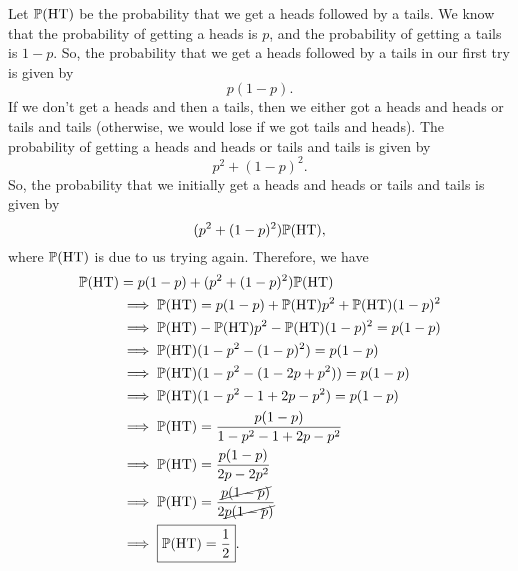\begin{mdframed}[]
    \begin{mdframed}[]
        Let $\mathbb{P}(\text{HT})$ be the probability that we get a heads followed by a tails. We know that the probability of getting a heads is $p$, and the probability of getting a tails is $1 - p$. So, the probability that we get a heads followed by a tails in our first try is given by
        \[p(1 - p).\]
        If we don't get a heads and then a tails, then we either got a heads and heads or tails and tails (otherwise, we would lose if we got tails and heads). The probability of getting a heads and heads or tails and tails is given by 
        \[p^2 + (1 - p)^2.\]
        So, the probability that we initially get a heads and heads or tails and tails is given by
        \[(p^2 + (1 - p)^2) \mathbb{P}(\text{HT}),\]
        where $\mathbb{P}(\text{HT})$ is due to us trying again. Therefore, we have 
        \begin{equation*}
            \begin{aligned}
                \mathbb{P}(\text{HT}) &= p(1 - p) + (p^2 + (1 - p)^2) \mathbb{P}(\text{HT}) \\ 
                    &\implies \mathbb{P}(\text{HT}) = p(1 - p) + \mathbb{P}(\text{HT}) p^2 + \mathbb{P}(\text{HT}) (1 - p)^2 \\ 
                    &\implies \mathbb{P}(\text{HT}) - \mathbb{P}(\text{HT}) p^2 - \mathbb{P}(\text{HT}) (1 - p)^2 = p(1 - p) \\ 
                    &\implies \mathbb{P}(\text{HT}) (1 - p^2 - (1 - p)^2) = p(1 - p) \\ 
                    &\implies \mathbb{P}(\text{HT}) (1 - p^2 - (1 - 2p + p^2)) = p(1 - p) \\ 
                    &\implies \mathbb{P}(\text{HT}) (1 - p^2 - 1 + 2p - p^2) = p(1 - p) \\ 
                    &\implies \mathbb{P}(\text{HT}) = \frac{p(1 - p)}{1 - p^2 - 1 + 2p - p^2} \\ 
                    &\implies \mathbb{P}(\text{HT}) = \frac{p(1 - p)}{2p - 2p^2} \\ 
                    &\implies \mathbb{P}(\text{HT}) = \frac{\cancel{p(1 - p)}}{2 \cancel{p(1 - p)}} \\ 
                    &\implies \boxed{\mathbb{P}(\text{HT}) = \frac{1}{2}}.
            \end{aligned}
        \end{equation*}
    \end{mdframed}
\end{mdframed}

